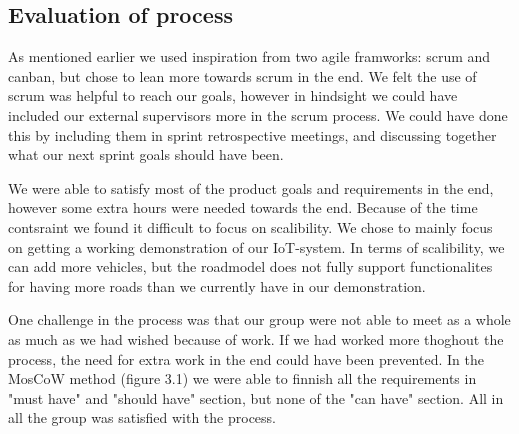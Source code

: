 \subsection{Evaluation of process}

As mentioned earlier we used inspiration from two agile framworks: scrum and canban, but chose to lean more towards scrum in the end. We felt the use of scrum was helpful to reach our goals, however in hindsight we could have included our external supervisors more in the scrum process. We could have done this by including them in sprint retrospective meetings, and discussing together what our next sprint goals should have been.

We were able to satisfy most of the product goals and requirements in the end, however some extra hours were needed towards the end. Because of the time contsraint we found it difficult to focus on scalibility. We chose to mainly focus on getting a working demonstration of our IoT-system. In terms of scalibility, we can add more vehicles, but the roadmodel does not fully support functionalites for having more roads than we currently have in our demonstration. 

One challenge in the process was that our group were not able to meet as a whole as much as we had wished because of work. If we had worked more thoghout the process, the need for extra work in the end could have been prevented. In the MosCoW method (figure 3.1) we were able to finnish all the requirements in "must have" and "should have" section, but none of the "can have" section. All in all the group was satisfied with the process.